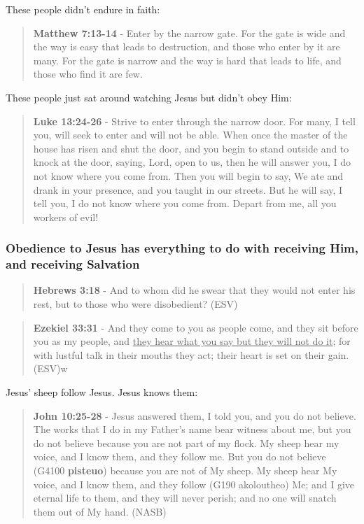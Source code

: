 \documentclass[11pt]{article}
\begin{document}
These people didn't endure in faith:

\begin{quote}
\textbf{Matthew 7:13-14} - Enter by the narrow gate. For the gate is wide and the way is easy that leads to destruction, and those who enter by it are many. For the gate is narrow and the way is hard that leads to life, and those who find it are few.
\end{quote}

These people just sat around watching Jesus but didn't obey Him:

\begin{quote}
\textbf{Luke 13:24-26} - Strive to enter through the narrow door. For many, I tell you, will seek to enter and will not be able. When once the master of the house has risen and shut the door, and you begin to stand outside and to knock at the door, saying, Lord, open to us, then he will answer you, I do not know where you come from. Then you will begin to say, We ate and drank in your presence, and you taught in our streets. But he will say, I tell you, I do not know where you come from. Depart from me, all you workers of evil!
\end{quote}

\subsubsection{Obedience to Jesus has everything to do with receiving Him, and receiving Salvation}
\label{sec:orgc07f73c}
\begin{quote}
\textbf{Hebrews 3:18} - And to whom did he swear that they would not enter his rest, but to those who were disobedient? (ESV)
\end{quote}

\begin{quote}
\textbf{Ezekiel 33:31} - And they come to you as people come, and they sit before you as my people, and \uline{they hear what you say but they will not do it}; for with lustful talk in their mouths they act; their heart is set on their gain. (ESV)w
\end{quote}

Jesus' sheep follow Jesus. Jesus knows them:

\begin{quote}
\textbf{John 10:25-28} - Jesus answered them, I told you, and you do not believe. The works that I do in my Father's name bear witness about me, but you do not believe because you are not part of my flock. My sheep hear my voice, and I know them, and they follow me. But you do not believe (G4100 \textbf{pisteuo}) because you are not of My sheep. My sheep hear My voice, and I know them, and they follow (G190 akoloutheo) Me; and I give eternal life to them, and they will never perish; and no one will snatch them out of My hand. (NASB)
\end{quote}
\end{document}
